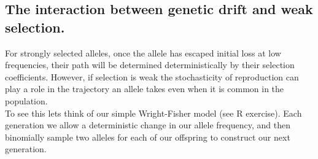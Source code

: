 \subsection{The interaction between genetic drift and weak selection.}
For strongly selected alleles, once the allele has escaped initial
loss at low frequencies, their path will be determined deterministically by their
selection coefficients. However, if selection is weak the
stochasticity of reproduction can play a role in the trajectory an
allele takes even when it is common in the population.\\

To see this lets think of our simple Wright-Fisher model (see R
exercise). Each generation we allow a deterministic change in our
allele frequency, and then binomially sample two alleles for each of
our offspring to construct our next generation.\\



